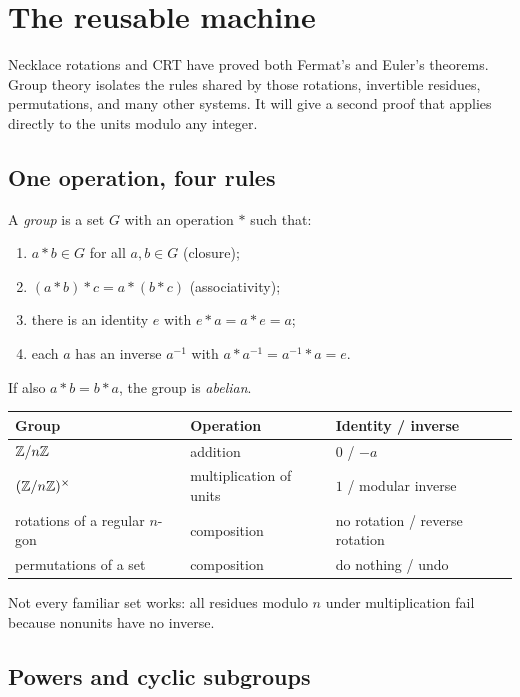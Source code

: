 \chapter{The reusable machine}
\label{chap:groups}

Necklace rotations and CRT have proved both Fermat's and Euler's theorems.
Group theory isolates the rules shared by those rotations, invertible
residues, permutations, and many other systems. It will give a second
proof that applies directly to the units modulo any integer.

\section{One operation, four rules}

\begin{definition}
A \emph{group} is a set $G$ with an operation $\ast$ such that:
\begin{enumerate}
  \item $a\ast b\in G$ for all $a,b\in G$ (closure);
  \item $(a\ast b)\ast c=a\ast(b\ast c)$ (associativity);
  \item there is an identity $e$ with $e\ast a=a\ast e=a$;
  \item each $a$ has an inverse $a^{-1}$ with $a\ast a^{-1}=a^{-1}\ast a=e$.
\end{enumerate}
If also $a\ast b=b\ast a$, the group is \emph{abelian}.
\end{definition}

\begin{center}
\begin{tabular}{lll}
\toprule
Group & Operation & Identity / inverse \\
\midrule
$\mathbb Z/n\mathbb Z$ & addition & $0$ / $-a$ \\
$(\mathbb Z/n\mathbb Z)^\times$ & multiplication of units & $1$ / modular inverse \\
rotations of a regular $n$-gon & composition & no rotation / reverse rotation \\
permutations of a set & composition & do nothing / undo \\
\bottomrule
\end{tabular}
\end{center}

Not every familiar set works: all residues modulo $n$ under multiplication fail because nonunits have no inverse.

\section{Powers and cyclic subgroups}

